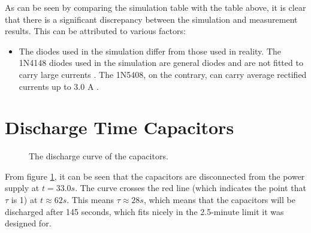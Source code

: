 As can be seen by comparing the simulation table with the table above, it is clear that there is a significant discrepancy between the simulation and measurement results. This can be attributed to various factors:
\begin{itemize}
    \item The diodes used in the simulation differ from those used in reality. The 1N4148 diodes used in the simulation are general diodes and are not fitted to carry large currents \cite{1n4148}. The 1N5408, on the contrary, can carry average rectified currents up to 3.0 A \cite{1n5408}.
\end{itemize}

\section{Discharge Time Capacitors}

\begin{figure}[H]
    \centering
    \captionsetup{justification=centering, labelfont=bf}
    \caption{The discharge curve of the capacitors.}
    \label{fig:dischargeCurve}
\end{figure}

From figure \ref{fig:dischargeCurve}, it can be seen that the capacitors are disconnected from the power supply at \(t=33.0s\). The curve crosses the red line (which indicates the point that \(\tau\) is 1) at \(t\approx 62s\). This means \(\tau \approx 28s\), which means that the capacitors will be discharged after 145 seconds, which fits nicely in the 2.5-minute limit it was designed for.
